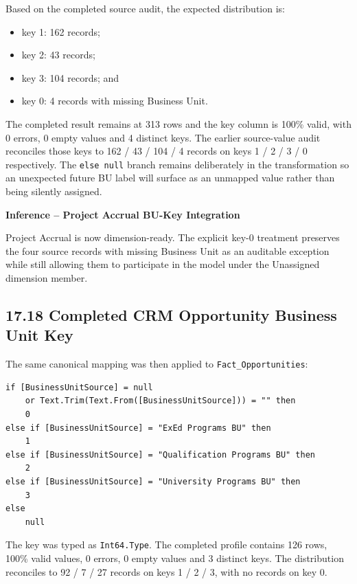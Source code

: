\documentclass[11pt,a4paper]{article}
\begin{document}
Based on the completed source audit, the expected distribution is:

\begin{itemize}[leftmargin=7mm,itemsep=2pt]
    \item key 1: 162 records;
    \item key 2: 43 records;
    \item key 3: 104 records; and
    \item key 0: 4 records with missing Business Unit.
\end{itemize}

The completed result remains at 313 rows and the key column is 100\% valid,
with 0 errors, 0 empty values and 4 distinct keys. The earlier source-value
audit reconciles those keys to 162 / 43 / 104 / 4 records on keys
1 / 2 / 3 / 0 respectively. The \texttt{else null} branch remains
deliberately in the transformation so an unexpected future BU label will
surface as an unmapped value rather than being silently assigned.

\begin{inferencebox}

\textbf{Inference -- Project Accrual BU-Key Integration}

Project Accrual is now dimension-ready. The explicit key-0 treatment preserves
the four source records with missing Business Unit as an auditable exception
while still allowing them to participate in the model under the Unassigned
dimension member.

\end{inferencebox}

\subsection{17.18 Completed CRM Opportunity Business Unit Key}

The same canonical mapping was then applied to
\texttt{Fact\_Opportunities}:

\begin{lstlisting}[style=powerquery]
if [BusinessUnitSource] = null
    or Text.Trim(Text.From([BusinessUnitSource])) = "" then
    0
else if [BusinessUnitSource] = "ExEd Programs BU" then
    1
else if [BusinessUnitSource] = "Qualification Programs BU" then
    2
else if [BusinessUnitSource] = "University Programs BU" then
    3
else
    null
\end{lstlisting}

The key was typed as \texttt{Int64.Type}. The completed profile contains
126 rows, 100\% valid values, 0 errors, 0 empty values and 3 distinct keys.
The distribution reconciles to 92 / 7 / 27 records on keys 1 / 2 / 3, with
no records on key 0.
\end{document}
